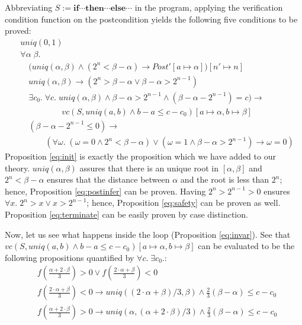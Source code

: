 \documentclass{article}
\begin{document}
Abbreviating $S := \textbf{if} \cdots \textbf{then}\cdots \textbf{else}\cdots$ in the program, 
applying the verification condition function on the postcondition yields the following
five conditions to be proved:
\begin{align}
&uniq(0,1) \label{eq:init}\\
&\forall \alpha\;\beta.\nonumber\\
&\quad \big(uniq(\alpha,\beta) \land (2^n<\beta-\alpha) \to Post'[a\mapsto \alpha]\big)[n'\mapsto n] \label{eq:postinfer}\\
&\quad uniq(\alpha, \beta) \to  (2^n>\beta-\alpha \lor \beta-\alpha > 2^{n-1}) \label{eq:safety}\\
&\quad \exists c_0.\; \forall c.\;
uniq(\alpha,\beta) \land \beta-\alpha>2^{n-1} \land (\beta-\alpha-2^{n-1}) = c) 
\to \label{eq:invar}\\
\nonumber
&\quad \qquad\qquad vc(S, uniq(a,b)\land b-a\leq c - c_0)[a\mapsto \alpha, b\mapsto \beta] \\
&\quad (\beta-\alpha-2^{n-1}\leq 0) \to 
\label{eq:terminate}\\
&\quad \qquad (\forall \omega.\; (\omega = 0\land 2^n < \beta - \alpha) 
\lor (\omega = 1 \land \beta-\alpha> 2^{n-1})
\to \omega = 0) \nonumber
\end{align}
Proposition \ref{eq:init} is exactly the proposition which we have added to our theory.
$uniq(\alpha, \beta)$ assures that there is an unique root in $[\alpha, \beta]$ and
$2^n<\beta-\alpha$ ensures that the distance between $\alpha$ and the 
root is less than $2^n$; hence, Proposition \ref{eq:postinfer} can be proven.
Having $2^n>2^{n-1}>0$ ensures $\forall x.\; 2^n>x\lor x > 2^{n-1}$; hence,
Proposition \ref{eq:safety} can be proven as well.
Proposition \ref{eq:terminate} can be easily proven by case distinction.

Now, let us see what happens inside the loop (Proposition \ref{eq:invar}).
See that $vc(S, uniq(a,b)\land b-a\leq c-c_0)[a\mapsto \alpha, b \mapsto \beta]$ can be 
evaluated to be the following propositions quantified by $\forall c.\;\exists c_0.$:
\begin{align*}
&f\left(\frac{\alpha+2\cdot \beta}{3}\right) > 0 \lor
 f\left(\frac{2\cdot \alpha+ \beta}{3}\right) < 0 \\
& f\left(\frac{2\cdot \alpha+ \beta}{3}\right) < 0
\to uniq((2\cdot\alpha+\beta)/3, \beta) \land \frac{2}{3}(\beta-\alpha) \leq c-c_0\\
&f\left(\frac{\alpha+2\cdot \beta}{3}\right) > 0 \to 
uniq(\alpha, (\alpha+2\cdot\beta)/3) \land \frac{2}{3}(\beta-\alpha)  \leq c - c_0
\end{align*}
\end{document}
